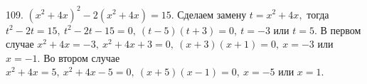 109. $(x^2+4x)^2-2(x^2+4x)=15.$ Сделаем замену $t=x^2+4x,$ тогда $t^2-2t=15,\ t^2-2t-15=0,\ (t-5)(t+3)=0,\ t=-3$ или $t=5.$ В первом случае $x^2+4x=-3,\ x^2+4x+3=0,\ (x+3)(x+1)=0,\ x=-3$ или $x=-1.$ Во втором случае $x^2+4x=5,\ x^2+4x-5=0,\ (x+5)(x-1)=0,\ x=-5$ или $x=1.$\\
